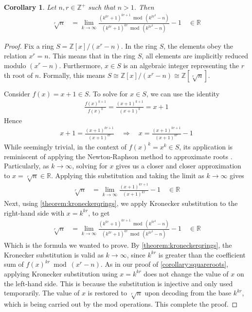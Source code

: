 \documentclass[11pt,reqno]{article}
\theoremstyle{plain}
\newtheorem{corollary}[theorem]{Corollary}
\theoremstyle{definition}
\begin{document}
\begin{corollary} \label{corollary:roots}
Let $n,r \in \mathbb{Z}^+$ such that $n > 1$. Then
\begin{align*}
\sqrt[r]{n} &= \lim_{k\rightarrow\infty}
    \frac{(k^{kr} + 1)^{kr+1} \bmod{(k^{kr^2}-n)}}
    {(k^{kr} + 1)^{kr} \bmod{ (k^{kr^2}-n)}} - 1  \quad \in \mathbb{R}
\end{align*}
\end{corollary}
\begin{proof}
Fix a ring $S = \mathbb{Z}[x]/(x^r - n)$. In the ring $S$, the elements obey the relation $x^r = n$. This means that in the ring $S$, all elements are implicitly reduced modulo $(x^r - n)$. Furthermore, $x \in S$ is an algebraic integer representing the $r$th root of $n$. Formally, this means $S \cong \mathbb{Z}[x]/(x^r - n) \cong \mathbb{Z}[\sqrt[r]{n}]$.

Consider $f(x) = x+1 \in S$. To solve for $x \in S$, we can use the identity
\begin{align*}
    \frac{f(x)^{k+1}}{f(x)^k} = \frac{(x+1)^{k+1}}{(x+1)^k} = x + 1
\end{align*}
Hence
\begin{align*}
    x + 1 = \frac{(x+1)^{kr+1}}{(x+1)^{kr}}
    \quad \Longrightarrow \quad
    x = \frac{(x+1)^{kr+1}}{(x+1)^{kr}} - 1
\end{align*}
While seemingly trivial, in the context of $f(x)^k = x^k \in S$, its application is reminiscent of applying the Newton-Raphson method to approximate roots \cite{hubbard2001roots}. Particularly, as $k\rightarrow\infty$, solving for $x$ gives us a closer and closer approximation to $x = \sqrt[r]{n} \in \mathbb{R}$. Applying this substitution and taking the limit as $k\rightarrow\infty$ gives
\begin{align*}
    \sqrt[r]{n} &= \lim_{k\rightarrow\infty} \frac{(x+1)^{kr+1}}{(x+1)^{kr}} - 1 \quad \in \mathbb{R}
\end{align*}
Next, using \cref{theorem:kroneckerqrings}, we apply Kronecker substitution to the right-hand side with $x = k^{kr}$, to get
\begin{align*}
\sqrt[r]{n} &= \lim_{k\rightarrow\infty}
    \frac{(k^{kr} + 1)^{kr+1} \bmod{(k^{kr^2}-n)}}
    {(k^{kr} + 1)^{kr} \bmod{ (k^{kr^2}-n)}} - 1  \quad \in \mathbb{R}
\end{align*}
Which is the formula we wanted to prove. By \cref{theorem:kroneckerqrings}, the Kronecker substitution is valid as $k\rightarrow\infty$, since $k^{kr}$ is greater than the coefficient sum of $f(x)^{kr} \bmod{(x^r-n)}$. As in our proof of \cref{corollary:squareroots}, applying Kronecker substitution using $x=k^{kr}$ does not change the value of $x$ on the left-hand side. This is because the substitution is injective and only used temporarily. The value of $x$ is restored to $\sqrt[r]{n}$ upon decoding from the base $k^{kr}$, which is being carried out by the mod operations. This complete the proof.
\end{proof}
\end{document}

